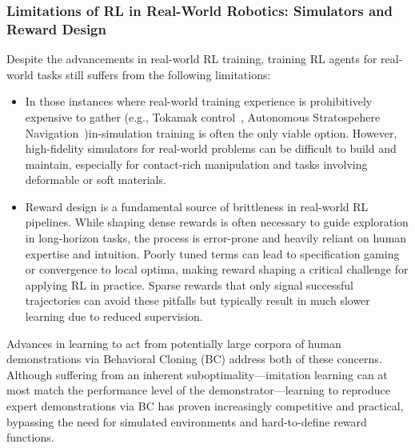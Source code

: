 \subsubsection{Limitations of RL in Real-World Robotics: Simulators and Reward Design}

Despite the advancements in real-world RL training, training RL agents for real-world tasks still suffers from the following limitations:
\begin{itemize}
\item In those instances where real-world training experience is prohibitively expensive to gather (e.g., Tokamak control~\citep{degraveMagneticControlTokamak2022}, Autonomous Stratospehere Navigation~\citep{bellemareAutonomousNavigationStratospheric2020})in-simulation training is often the only viable option. 
However, high-fidelity simulators for real-world problems can be difficult to build and maintain, especially for contact-rich manipulation and tasks involving deformable or soft materials.

\item Reward design is a fundamental source of brittleness in real-world RL pipelines. While shaping dense rewards is often necessary to guide exploration in long-horizon tasks, the process is error-prone and heavily reliant on human expertise and intuition. Poorly tuned terms can lead to specification gaming or convergence to local optima, making reward shaping a critical challenge for applying RL in practice. Sparse rewards that only signal successful trajectories can avoid these pitfalls but typically result in much slower learning due to reduced supervision.
\end{itemize}

Advances in learning to act from potentially large corpora of human demonstrations via Behavioral Cloning (BC) address both of these concerns.
Although suffering from an inherent suboptimality---imitation learning can at most match the performance level of the demonstrator---learning to reproduce expert demonstrations via BC has proven increasingly competitive and practical, bypassing the need for simulated environments and hard-to-define reward functions.
